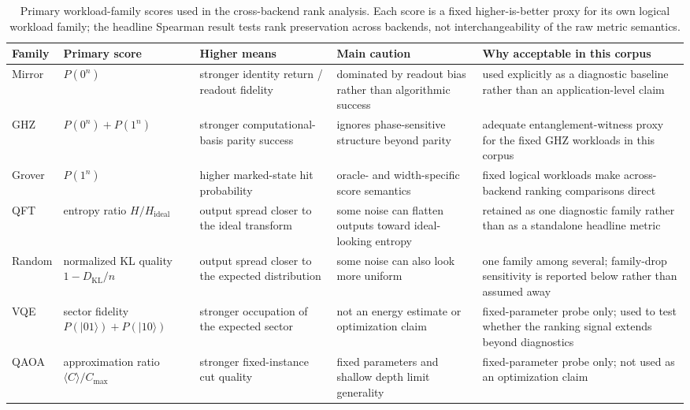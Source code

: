 \documentclass[aps,prxquantum,twocolumn,superscriptaddress,amsmath,amssymb,longbibliography,floatfix]{revtex4-2}
\begin{document}
\begin{table}[t]
\caption{Primary workload-family scores used in the cross-backend rank analysis. Each score is a fixed higher-is-better proxy for its own logical workload family; the headline Spearman result tests rank preservation across backends, not interchangeability of the raw metric semantics.}
\label{tab:metric_justification}
\footnotesize
\begin{ruledtabular}
\begin{tabular}{p{2.0cm}p{3.0cm}p{2.8cm}p{3.3cm}p{4.1cm}}
Family & Primary score & Higher means & Main caution & Why acceptable in this corpus \\
\hline
Mirror & $P(0^n)$ & stronger identity return / readout fidelity & dominated by readout bias rather than algorithmic success & used explicitly as a diagnostic baseline rather than an application-level claim \\
GHZ & $P(0^n){+}P(1^n)$ & stronger computational-basis parity success & ignores phase-sensitive structure beyond parity & adequate entanglement-witness proxy for the fixed GHZ workloads in this corpus \\
Grover & $P(1^n)$ & higher marked-state hit probability & oracle- and width-specific score semantics & fixed logical workloads make across-backend ranking comparisons direct \\
QFT & entropy ratio $H/H_{\mathrm{ideal}}$ & output spread closer to the ideal transform & some noise can flatten outputs toward ideal-looking entropy & retained as one diagnostic family rather than as a standalone headline metric \\
Random & normalized KL quality $1 - D_{\mathrm{KL}}/n$ & output spread closer to the expected distribution & some noise can also look more uniform & one family among several; family-drop sensitivity is reported below rather than assumed away \\
VQE & sector fidelity $P(|01\rangle){+}P(|10\rangle)$ & stronger occupation of the expected sector & not an energy estimate or optimization claim & fixed-parameter probe only; used to test whether the ranking signal extends beyond diagnostics \\
QAOA & approximation ratio $\langle C \rangle / C_{\max}$ & stronger fixed-instance cut quality & fixed parameters and shallow depth limit generality & fixed-parameter probe only; not used as an optimization claim \\
\end{tabular}
\end{ruledtabular}
\end{table}
\end{document}
